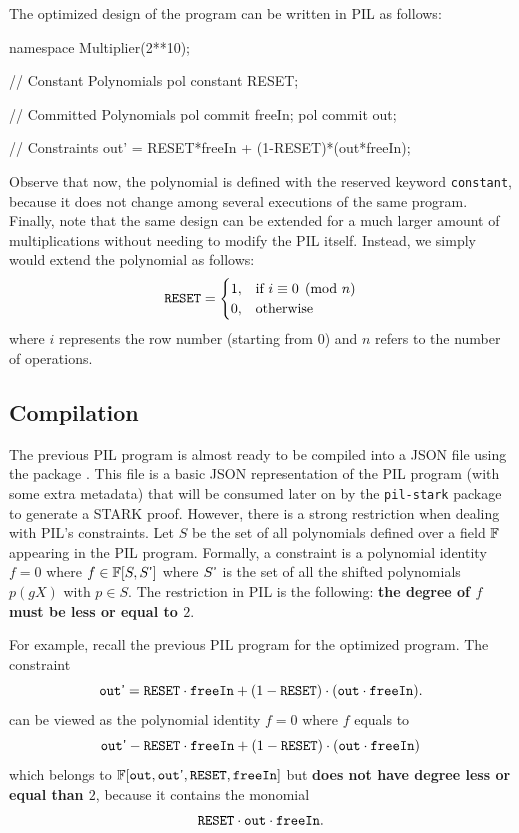 The optimized design of the \Multiplier program can be written in PIL as follows:
\begin{pil}
    namespace Multiplier(2**10);
    
    // Constant Polynomials
    pol constant RESET;
    
    // Committed Polynomials
    pol commit freeIn;
    pol commit out;
    
    // Constraints
    out' = RESET*freeIn + (1-RESET)*(out*freeIn);
\end{pil}
Observe that now, the polynomial \RESET is defined with the reserved keyword \texttt{constant}, because it does not change among several executions of the same program. Finally, note that the same design can be extended for a much larger amount of multiplications without needing to modify the PIL itself. Instead, we simply would extend the \RESET polynomial as follows:
\[
\mathtt{RESET} = 
\begin{cases}
    1, & \text{if } i \equiv 0 \pmod{n} \\
    0, & \text{otherwise}
\end{cases}
\]
where $i$ represents the row number (starting from $0$) and $n$ refers to the number of operations.




\subsection{Compilation}

The previous PIL program is almost ready to be compiled into a JSON file using the \pilcom package \cite{pilcom}. This file is a basic JSON representation of the PIL program (with some extra metadata) that will be consumed later on by the \texttt{pil-stark} package \cite{pilstark} to generate a STARK proof. However, there is a strong restriction when dealing with PIL's constraints. Let $S$ be the set of all polynomials defined over a field $\mathbb{F}$ appearing in the PIL program. Formally, a constraint is a polynomial identity $f = 0$ where $f \in \mathbb{F}[S, S\textsf{'}]$ where $S\textsf{'}$ is the set of all the shifted polynomials $p(g X)$ with $p \in S$. The restriction in PIL is the following: \textbf{the degree of $f$ must be less or equal to $2$}.

For example, recall the previous PIL program for the optimized \Multiplier program. The constraint 
\[
\mathtt{out}\textsf{'} = \mathtt{RESET} \cdot \mathtt{freeIn} + (1 - \mathtt{RESET}) \cdot (\mathtt{out} \cdot \mathtt{freeIn}).
\]
can be viewed as the polynomial identity $f = 0$ where $f$ equals to
\[
\mathtt{out}\textsf{'} - \mathtt{RESET} \cdot \mathtt{freeIn} + (1 - \mathtt{RESET}) \cdot (\mathtt{out} \cdot \mathtt{freeIn})
\]
which belongs to $\mathbb{F}[\mathtt{out}, \mathtt{out}\textsf{'}, \mathtt{RESET}, \mathtt{freeIn}]$ but \textbf{does not have degree less or equal than $2$}, because it contains the monomial
\[
\mathtt{RESET} \cdot \mathtt{out} \cdot \mathtt{freeIn}.
\]

